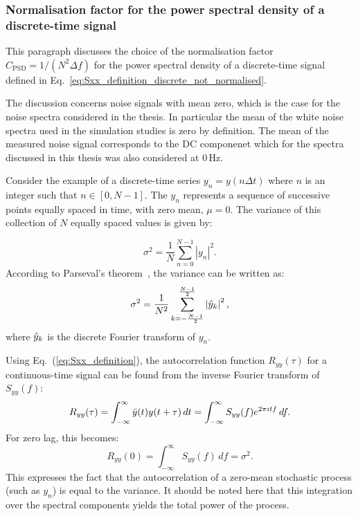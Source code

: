 \subsubsection*{Normalisation factor for the power spectral density of a discrete-time signal}\label{appendix_dft_normalisation}
This paragraph discusses the choice of the normalisation factor $C_\mathrm{PSD}=1/(N^2 \Delta f)$ for the power spectral density of a discrete-time signal defined in Eq.~\eqref{eq:Sxx_definition_discrete_not_normalised}.

The discussion concerns noise signals with mean zero, which is the case for the noise spectra considered in the thesis. In particular the mean of the white noise spectra used in the simulation studies is zero by definition. The mean of the measured noise signal corresponds to the DC componenet which for the spectra discussed in this thesis was also considered at 0\,Hz.


Consider the example of a discrete-time series $y_n = y(n\Delta t)$ where $n$ is an integer such that $n \in [0, N-1]$. The $y_n$ represents a sequence of successive points equally spaced in time, with zero mean, $\mu=0$. The variance of this collection of $N$ equally spaced values is given by:

\begin{equation}\label{eq:variance}
    \sigma^2 = \frac{1}{N}\sum_{n=0}^{N-1} \left | y_n \right |^2.
\end{equation}
According to Parseval's theorem~\cite{FFT_and_applications}, the variance can be written as:
\begin{equation}\label{eq:variance_2}
    \sigma^2 = \frac{1}{N^2}\sum_{k=-\frac{N-1}{2}}^{\frac{N-1}{2}} \left | \hat{y}_k \right |^2,
\end{equation}
where $\hat{y}_k$ is the discrete Fourier transform of $y_n$.

Using Eq.~(\ref{eq:Sxx_definition}), the autocorrelation function $R_{yy}(\tau)$ for a continuous-time signal can be found from the inverse Fourier transform of $S_{yy}(f)$:
\begin{equation}\label{eq:autocorrelation_ivnerse}
R_{yy}(\tau) = \int_{-\infty}^{\infty} \bar{y}(t) y(t+\tau) \, dt = \int_{-\infty}^{\infty} S_{yy}(f) e^{2\pi {i} t f} \, df.
\end{equation}
For zero lag, this becomes:
\begin{equation}\label{eq:autocorrelation_zero_lag}
R_{yy}(0) = \int_{-\infty}^{\infty} S_{yy}(f) \, df = \sigma^2.
\end{equation}
This expresses the fact that the autocorrelation of a zero-mean stochastic process (such as $y_n$) is equal to the variance. It should be noted here that this integration over the spectral components yields the total power of the process.

